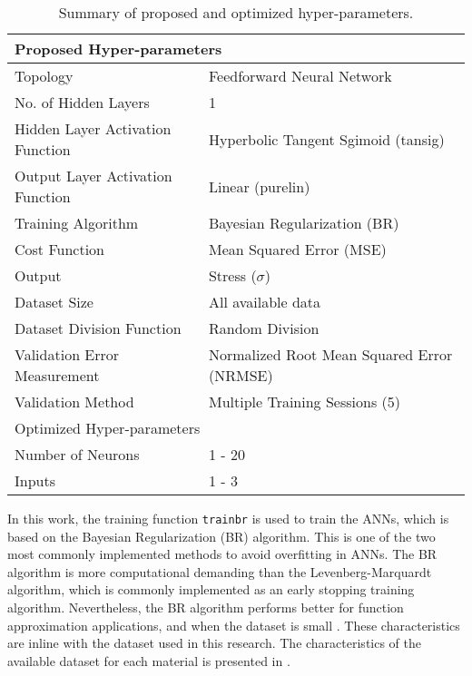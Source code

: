 \begin{table}[!htb]
    \centering
    \caption{Summary of proposed and optimized hyper-parameters.}
    \begin{tabular}{l l}
    \toprule
    \multicolumn{2}{l}{Proposed Hyper-parameters} \\
    \hline
    Topology                         & Feedforward Neural Network \\
    No. of Hidden Layers             & 1 \\
    Hidden Layer Activation Function & Hyperbolic Tangent Sgimoid (tansig)\\
    Output Layer Activation Function & Linear (purelin)\\
    Training Algorithm               & Bayesian Regularization (BR)\\
    Cost Function					 & Mean Squared Error (MSE)\\
    Output                           & Stress ($\sigma$)\\
    Dataset Size                     & All available data\\
    Dataset Division Function        & Random Division  \\
    Validation Error Measurement     & Normalized Root Mean Squared Error (NRMSE)\\
    Validation Method                & Multiple Training Sessions (5)\\
    \midrule
    \multicolumn{2}{l}{Optimized Hyper-parameters}\\
    \hline
    Number of Neurons            & 1 - 20 \\
    Inputs                       & 1 - 3 \\
    \bottomrule
    \end{tabular}
    \label{tbl:ANN_parameters}
\end{table}

In this work, the training function \texttt{trainbr} is used to train the ANNs, which is based on the Bayesian Regularization (BR) algorithm. This is one of the two most commonly implemented methods to avoid overfitting in ANNs. The BR algorithm is more computational demanding than the Levenberg-Marquardt algorithm, which is commonly implemented as an early stopping training algorithm. Nevertheless, the BR algorithm performs better for function approximation applications, and when the dataset is small \cite{matlab2019improve}. These characteristics are inline with the dataset used in this research. The characteristics of the available dataset for each material is presented in .

